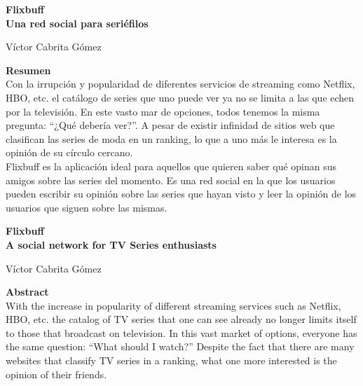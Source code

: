 \thispagestyle{empty}

\begin{center}
{\large\bfseries Flixbuff \\ Una red social para seriéfilos }\\
\end{center}
\begin{center}
Víctor Cabrita Gómez\\
\end{center}

\vspace{0.7cm}

\noindent\textbf{Resumen}\\

Con la irrupción y popularidad de diferentes servicios de streaming como Netflix, HBO, etc. el catálogo de series que uno puede ver ya no se limita a las que echen por la televisión. En este vasto mar de opciones, todos tenemos la misma pregunta: ``¿Qué debería ver?''. A pesar de existir infinidad de sitios web que clasifican las series de moda en un ranking, lo que a uno más le interesa es la opinión de su círculo cercano.\\

Flixbuff es la aplicación ideal para aquellos que quieren saber qué opinan sus amigos sobre las series del momento. Es una red social en la que los usuarios pueden escribir su opinión sobre las series que hayan visto y leer la opinión de los usuarios que siguen sobre las mismas.

\cleardoublepage{}

\begin{center}
	{\large\bfseries Flixbuff \\ A social network for TV Series enthusiasts}\\
\end{center}
\begin{center}
	Víctor Cabrita Gómez\\
\end{center}
\vspace{0.7cm}

\noindent\textbf{Abstract}\\

With the increase in popularity of different streaming services such as Netflix, HBO, etc. the catalog of TV series that one can see already no longer limits itself to those that broadcast on television. In this vast market of options, everyone has the same question: ``What should I watch?'' Despite the fact that there are many websites that classify TV series in a ranking, what one more interested is the opinion of their friends.\\

